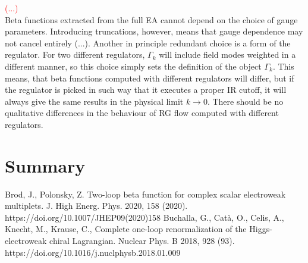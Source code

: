 \documentclass[11pt, a4paper]{article}
\begin{document}
\textcolor{red}{(...)}\\
Beta functions extracted from the full EA cannot depend on the choice of gauge parameters.
Introducing truncations, however, means that gauge dependence may not cancel entirely (...).
Another in principle redundant choice is a form of the regulator. For two different regulators,
$\Gamma_k$ will include field modes weighted in a different manner, so this choice simply
sets the definition of the object $\Gamma_k$. 
This means, that beta functions computed with different regulators will differ, but
if the regulator is picked in such way that it executes a proper IR cutoff,
it will always give the same results in the physical limit $k \rightarrow 0$. There should be no
qualitative differences in the behaviour of RG flow computed with different regulators.





\section*{Summary}

\begin{thebibliography}{9}
    Brod, J., Polonsky, Z. Two-loop beta function for complex scalar electroweak multiplets. J. High Energ. Phys. 2020, 158 (2020). https://doi.org/10.1007/JHEP09(2020)158
    Buchalla, G., Catà, O., Celis, A., Knecht, M., Krause, C., Complete one-loop renormalization of the Higgs-electroweak chiral Lagrangian. Nuclear Phys. B 2018, 928 (93). https://doi.org/10.1016/j.nuclphysb.2018.01.009
\end{thebibliography}
\end{document}
